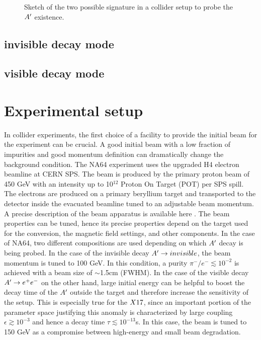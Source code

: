 \begin{figure}[bth!]
\centering
\caption[two signature sketch]{Sketch of the two possible signature in a collider setup to probe the $A'$ existence.}
\label{fig:two-signature}
\end{figure}

\subsection{invisible decay mode}
\label{ch2:sec:experimental-technique-invis}

\subsection{visible decay mode}
\label{ch2:sec:experimental-technique-vis}

\section{Experimental setup}
\label{ch2:sec:experimental-setup}

In collider experiments, the first choice of a facility to provide the initial beam for the experiment can be crucial. A good initial beam with a low fraction of impurities and good momentum definition can dramatically change the background condition. The NA64 experiment uses the upgraded H4 electron beamline at CERN SPS. The beam is produced by the primary proton beam of 450 \si{\giga\electronvolt} with an intensity up to 10$^{12}$ Proton On Target (POT) per SPS spill. The electrons are produced on a primary beryllium target and transported to the detector inside the evacuated beamline tuned to an adjustable beam momentum. A precise description of the beam apparatus is available here \cite{sps-beamline,h4-beamline}. The beam properties can be tuned, hence its precise properties depend on the target used for the conversion, the magnetic field settings, and other components. In the case of NA64, two different compositions are used depending on which $A'$ decay is being probed. In the case of the invisible decay $A'\to invisible$, the beam momentum is tuned to 100 \si{\giga\electronvolt}. In this condition, a purity $\pi^-/e^- \lesssim 10^{-2}$ is achieved with a beam size of $\sim$1.5\si{cm} (FWHM). In the case of the visible decay $A' \to e^+e^-$ on the other hand, large initial energy can be helpful to boost the decay time of the $A'$ outside the target and therefore increase the sensitivity of the setup. This is especially true for the $X17$, since an important portion of the parameter space justifying this anomaly is characterized by large coupling $\epsilon \gtrsim 10^{-3}$ and hence a decay time $\tau \lesssim 10^{-13}$\si{s}. In this case, the beam is tuned to 150 \si{\giga\electronvolt} as a compromise between high-energy and small beam degradation.

